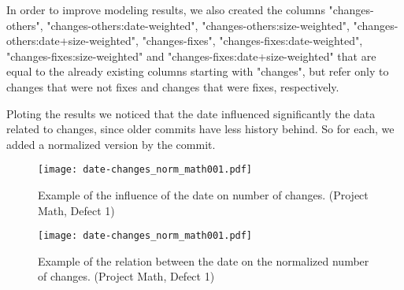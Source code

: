 
In order to improve modeling results, we also created the columns "changes-others", "changes-others:date-weighted", "changes-others:size-weighted", "changes-others:date+size-weighted", 
"changes-fixes", "changes-fixes:date-weighted", "changes-fixes:size-weighted" and "changes-fixes:date+size-weighted" that are equal to the already existing columns starting with
"changes", but refer only to changes that were not fixes and changes that were fixes, respectively.

Ploting the results we noticed that the date influenced significantly the data related to changes, since older commits have less history behind. 
So for each, we added a normalized version by the commit.

\begin{figure}[H]
  \begin{center}
    \leavevmode
    \texttt{[image: date-changes\_norm\_math001.pdf]}
    \caption{Example of the influence of the date on number of changes. (Project Math, Defect 1)}
    \label{fig:date-changes.raw}
  \end{center}
\end{figure}

\begin{figure}[H]
  \begin{center}
    \leavevmode
    \texttt{[image: date-changes\_norm\_math001.pdf]}
    \caption{Example of the relation between the date on the normalized number of changes. (Project Math, Defect 1)}
    \label{fig:date-changes.norm}
  \end{center}
\end{figure}

